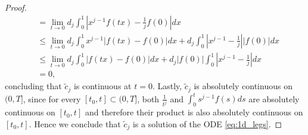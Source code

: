 \documentclass[10pt,a4paper]{amsart}
\newcommand{\abs}[1]{\left| #1 \right|}
\newcommand{\derivative}[1]{#1^{\prime}}
\begin{document}
\begin{proof}
\begin{align*}
        &= \lim_{t \to 0} 
        d_j \int_0^1 \abs{x^{j-1} f(tx) - \frac{1}{j}f(0) } dx \\
        &\leq \lim_{t \to 0} 
        d_j \int_0^1 x^{j-1} |f(tx) - f(0)| dx  + d_j \int_0^1 \abs{x^{j-1} - \frac{1}{j}} |f(0)| dx \\
        &\leq \lim_{t \to 0} 
        d_j \int_0^1 |f(tx) - f(0)| dx  
        + d_j |f(0)| \int_0^1 \abs{x^{j-1} - \frac{1}{j} }  dx \\
        &= 0,
    \end{align*}
    concluding that $\tilde{c}_j$ is continuous at $t=0$. 
    Lastly, $\tilde{c}_j$ is absolutely continuous on $(0,T]$, since for every $[t_0,t] \subset (0,T]$, 
    both $\frac{1}{t^j}$ and $\int^t_0 s^{j-1} f(s) ds$ are absolutely continuous on $[t_0,t]$ and therefore their product is also absolutely continuous on $[t_0,t]$. 
    Hence we conclude that $\tilde{c}_j$ is a solution of the ODE \eqref{eq:1d_legs}. 


\end{proof}
\end{document}
